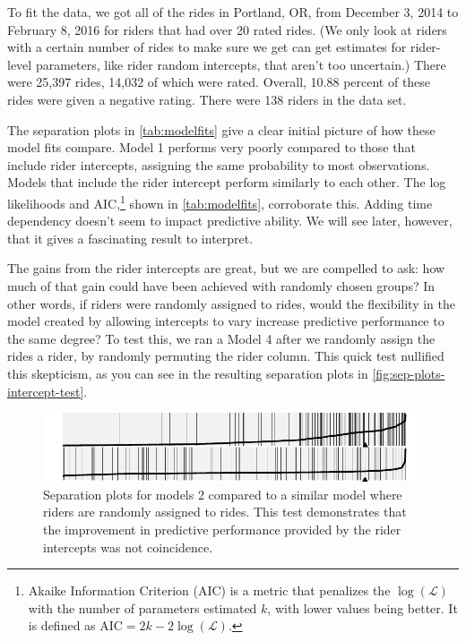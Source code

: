 \documentclass[12pt,twoside]{reedthesis}
\begin{document}
  
  To fit the data, we got all of the rides in Portland, OR, from December
  3, 2014 to February 8, 2016 for riders that had over 20 rated rides. (We
  only look at riders with a certain number of rides to make sure we get
  can get estimates for rider-level parameters, like rider random
  intercepts, that aren't too uncertain.) There were 25,397 rides, 14,032
  of which were rated. Overall, 10.88 percent of these rides were given a
  negative rating. There were 138 riders in the data set.
  
  The separation plots in \autoref{tab:modelfits} give a clear initial
  picture of how these model fits compare. Model 1 performs very poorly
  compared to those that include rider intercepts, assigning the same
  probability to most observations. Models that include the rider
  intercept perform similarly to each other. The log likelihoods and
  AIC,\footnote{Akaike Information Criterion (AIC) is a metric that
    penalizes the \(\log (\mathcal{L})\) with the number of parameters
    estimated \(k\), with lower values being better. It is defined as
    \(\text{AIC} = 2k - 2 \log(\mathcal{L})\).} shown in
  \autoref{tab:modelfits}, corroborate this. Adding time dependency
  doesn't seem to impact predictive ability. We will see later, however,
  that it gives a fascinating result to interpret.
  
  The gains from the rider intercepts are great, but we are compelled to
  ask: how much of that gain could have been achieved with randomly chosen
  groups? In other words, if riders were randomly assigned to rides, would
  the flexibility in the model created by allowing intercepts to vary
  increase predictive performance to the same degree? To test this, we ran
  a Model 4 after we randomly assign the rides a rider, by randomly
  permuting the rider column. This quick test nullified this skepticism,
  as you can see in the resulting separation plots in
  \autoref{fig:sep-plots-intercept-test}.
  
  \begin{figure}[tbh]
  \centering
  \includegraphics[angle = 0,scale = 1]{figure/intercept_test_plot.pdf}
  \caption[Separation plots for models 2 compared to a similar model where
  riders are randomly assigned to rides]{\normalsize{Separation plots for models 2 compared to a similar model where
  riders are randomly assigned to rides. This test demonstrates that the 
  improvement in predictive performance provided by the rider intercepts
  was not coincidence.}}
  \label{fig:sep-plots-intercept-test}
  \end{figure}
  
\end{document}
